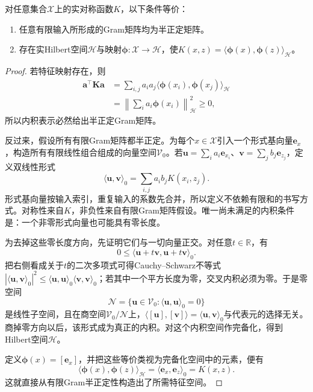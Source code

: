 \begin{theorem}[正定核与Hilbert特征映射]
  \label{thm:classification-svm-kernel-characterization}
  对任意集合$\mathcal{X}$上的实对称函数$K$，以下条件等价：
  \begin{enumerate}
    \item 任意有限输入所形成的Gram矩阵均为半正定矩阵。
    \item 存在实Hilbert空间$\mathcal{H}$与映射$\bm{\phi}:\mathcal{X}\to\mathcal{H}$，使$K(x,z)=\langle\bm{\phi}(x),\bm{\phi}(z)\rangle_{\mathcal{H}}$。
  \end{enumerate}
\end{theorem}
\begin{proof}
若特征映射存在，则
\[
  \begin{aligned}
    \bm{a}^{\top}\bm{K}\bm{a}
      &=\sum_{i,j}a_i a_j
         \langle\bm{\phi}(x_i),\bm{\phi}(x_j)\rangle_{\mathcal{H}}\\
      &=\left\lVert\sum_i a_i\bm{\phi}(x_i)\right\rVert_{\mathcal{H}}^2
        \ge0,
  \end{aligned}
\]
所以内积表示必然给出半正定Gram矩阵。

反过来，假设所有有限Gram矩阵都半正定。为每个$x\in\mathcal{X}$引入一个形式基向量$\bm{e}_x$，构造所有有限线性组合组成的向量空间$\mathcal{V}_0$。若$\bm{u}=\sum_i a_i\bm{e}_{x_i}$、$\bm{v}=\sum_j b_j\bm{e}_{z_j}$，定义双线性形式
\[
  \langle\bm{u},\bm{v}\rangle_0
  =\sum_{i,j}a_i b_j K(x_i,z_j).
\]
形式基向量按输入索引，重复输入的系数先合并，所以定义不依赖有限和的书写方式。对称性来自$K$，非负性来自有限Gram矩阵假设。唯一尚未满足的内积条件是：一个非零形式向量也可能具有零长度。

为去掉这些零长度方向，先证明它们与一切向量正交。对任意$t\in\mathbb{R}$，有
\[
  0\le\langle\bm{u}+t\bm{v},\bm{u}+t\bm{v}\rangle_0.
\]
把右侧看成关于$t$的二次多项式可得Cauchy--Schwarz不等式$|\langle\bm{u},\bm{v}\rangle_0|^2\le\langle\bm{u},\bm{u}\rangle_0\langle\bm{v},\bm{v}\rangle_0$；若其中一个平方长度为零，交叉内积必须为零。于是零空间
\[
  \mathcal{N}
  =\{\bm{u}\in\mathcal{V}_0:
       \langle\bm{u},\bm{u}\rangle_0=0\}
\]
是线性子空间，且在商空间$\mathcal{V}_0/\mathcal{N}$上，$\langle[\bm{u}],[\bm{v}]\rangle=\langle\bm{u},\bm{v}\rangle_0$与代表元的选择无关。商掉零方向以后，该形式成为真正的内积。对这个内积空间作完备化，得到Hilbert空间$\mathcal{H}$。

定义$\bm{\phi}(x)=[\bm{e}_x]$，并把这些等价类视为完备化空间中的元素，便有
\[
  \langle\bm{\phi}(x),\bm{\phi}(z)\rangle_{\mathcal{H}}
  =\langle\bm{e}_x,\bm{e}_z\rangle_0=K(x,z).
\]
这就直接从有限Gram半正定性构造出了所需特征空间。
\end{proof}

